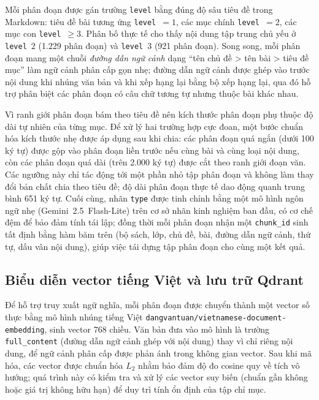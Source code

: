\documentclass[../DoAn.tex]{subfiles}
\begin{document}
Mỗi phân đoạn được gán trường \texttt{level} bằng đúng độ sâu tiêu đề trong Markdown: tiêu đề bài tương ứng \texttt{level}~$=1$, các mục chính \texttt{level}~$=2$, các mục con \texttt{level}~$\geq 3$. Phân bố thực tế cho thấy nội dung tập trung chủ yếu ở \texttt{level}~$2$ (1.229 phân đoạn) và \texttt{level}~$3$ (921 phân đoạn). Song song, mỗi phân đoạn mang một chuỗi \textit{đường dẫn ngữ cảnh} dạng ``tên chủ đề > tên bài > tiêu đề mục'' làm ngữ cảnh phân cấp gọn nhẹ; đường dẫn ngữ cảnh được ghép vào trước nội dung khi nhúng văn bản và khi xếp hạng lại bằng bộ xếp hạng lại, qua đó hỗ trợ phân biệt các phân đoạn có câu chữ tương tự nhưng thuộc bài khác nhau.

Vì ranh giới phân đoạn bám theo tiêu đề nên kích thước phân đoạn phụ thuộc độ dài tự nhiên của từng mục. Để xử lý hai trường hợp cực đoan, một bước chuẩn hóa kích thước nhẹ được áp dụng sau khi chia: các phân đoạn quá ngắn (dưới 100 ký tự) được gộp vào phân đoạn liền trước nếu cùng bài và cùng loại nội dung, còn các phân đoạn quá dài (trên 2.000 ký tự) được cắt theo ranh giới đoạn văn. Các ngưỡng này chỉ tác động tới một phần nhỏ tập phân đoạn và không làm thay đổi bản chất chia theo tiêu đề; độ dài phân đoạn thực tế dao động quanh trung bình 651 ký tự. Cuối cùng, nhãn \texttt{type} được tinh chỉnh bằng một mô hình ngôn ngữ nhẹ (Gemini~2.5~Flash-Lite) trên cơ sở nhãn kinh nghiệm ban đầu, có cơ chế đệm để bảo đảm tính tái lập; đồng thời mỗi phân đoạn nhận một \texttt{chunk\_id} sinh tất định bằng hàm băm trên (bộ sách, lớp, chủ đề, bài, đường dẫn ngữ cảnh, thứ tự, dấu vân nội dung), giúp việc tái dựng tập phân đoạn cho cùng một kết quả.

\subsection{Biểu diễn vector tiếng Việt và lưu trữ Qdrant}

Để hỗ trợ truy xuất ngữ nghĩa, mỗi phân đoạn được chuyển thành một vector số thực bằng mô hình nhúng tiếng Việt \texttt{dangvantuan/vietnamese-document-embedding}, sinh vector 768 chiều. Văn bản đưa vào mô hình là trường \texttt{full\_content} (đường dẫn ngữ cảnh ghép với nội dung) thay vì chỉ riêng nội dung, để ngữ cảnh phân cấp được phản ánh trong không gian vector. Sau khi mã hóa, các vector được chuẩn hóa $L_2$ nhằm bảo đảm độ đo cosine quy về tích vô hướng; quá trình này có kiểm tra và xử lý các vector suy biến (chuẩn gần không hoặc giá trị không hữu hạn) để duy trì tính ổn định của tập chỉ mục.
\end{document}
